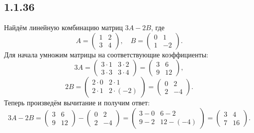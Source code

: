 \subsection{1.1.36}

Найдём линейную комбинацию матриц $3A-2B$, где
\[
A=
\begin{pmatrix}
	1 & 2 \\
	3 & 4
\end{pmatrix}
,\quad B=
\begin{pmatrix}
	0 & 1 \\
	1 & -2
\end{pmatrix}
.
\]
Для начала умножим матрицы на соответствующие коэффициенты:
\[
3A=
\begin{pmatrix}
	3\cdot1 & 3\cdot2 \\
	3\cdot3 & 3\cdot4
\end{pmatrix}
=
\begin{pmatrix}
	3 & 6 \\
	9 & 12
\end{pmatrix}
,
\]
\[
2B=
\begin{pmatrix}
	2\cdot0 & 2\cdot1 \\
	2\cdot1 & 2\cdot(-2)
\end{pmatrix}
=
\begin{pmatrix}
	0 & 2 \\
	2 & -4
\end{pmatrix}
.
\]
Теперь произведём вычитание и получим ответ:
\[
3A-2B=
\begin{pmatrix}
	3 & 6 \\
	9 & 12
\end{pmatrix}
-
\begin{pmatrix}
	0 & 2 \\
	2 & -4
\end{pmatrix}
=
\begin{pmatrix}
	3-0 & 6-2 \\
	9-2 & 12-(-4)
\end{pmatrix}
=
\begin{pmatrix}
	3 & 4 \\
	7 & 16
\end{pmatrix}
.
\]